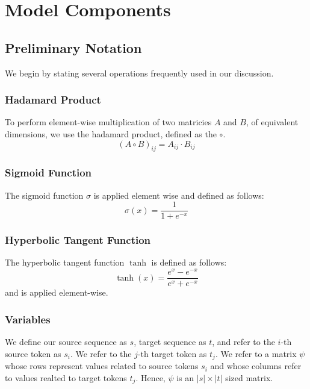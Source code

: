\documentclass[twoside,twocolumn]{article}
\begin{document}
\section{Model Components}
\subsection{Preliminary Notation}
We begin by stating several operations frequently used in our discussion.

\subsubsection{Hadamard Product}

To perform element-wise multiplication of two matricies $A$ and $B$, of equivalent dimensions, we use the hadamard product, defined as the $\circ$.
\begin{equation}
  (A \circ B)_{ij} = A_{ij} \cdot B_{ij}
\end{equation}

\subsubsection{Sigmoid Function}

The sigmoid function $\sigma$ is applied element wise and defined as follows:
\begin{equation}
  \sigma(x) = \frac{1}{1+e^{-x}}
\end{equation}

\subsubsection{Hyperbolic Tangent Function}

The hyperbolic tangent function $\tanh$ is defined as follows:
\begin{equation}
  \tanh(x) = \frac{e^x - e^{-x}} {e^x + e^{-x}}
\end{equation}
and is applied element-wise.

\subsubsection{Variables}
We define our source sequence as $s$, target sequence as $t$, and refer to the $i$-th source token as $s_i$. We refer to the $j$-th target token as $t_j$. We refer to a matrix $\psi$ whose rows represent values related to source tokens $s_i$ and whose columns refer to values realted to target tokens $t_j$. Hence, $\psi$ is an $|s| \times |t|$ sized matrix.
\end{document}
